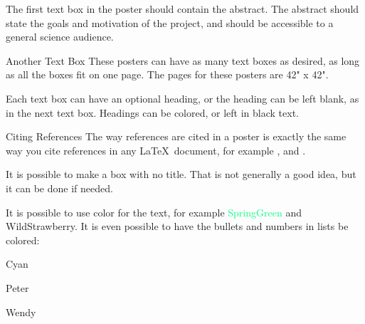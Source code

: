 \documentclass[12pt]{article}
\begin{document}
\begin{posterbard}



\begin{posterboxabstract} 
The first text box in the poster should contain the abstract. The abstract should state the goals and motivation of the project, and should be accessible to a general science audience.
\end{posterboxabstract}

\begin{posterboxtitle}{Another Text Box}
These posters can have as many text boxes as desired, as long as all the boxes fit on one page.  The pages for these posters are 42" x 42".

Each text box can have an optional heading, or the heading can be left blank, as in the next text box.  Headings can be colored, or left in black text.
\end{posterboxtitle}

\begin{posterboxtitle}{Citing References}
The way references are cited in a poster is exactly the same way you cite references in any \LaTeX\ document, for example \cite{CALCULUS}, \cite{PROJECT} and \cite{HOMOLOGY}.
\end{posterboxtitle}

\begin{posterboxnotitle}
It is possible to make a box with no title.  That is not generally a good idea, but it can be done if needed.
\end{posterboxnotitle}


\begin{posterboxnotitle}
It is possible to use color for the text, for example \textcolor{SpringGreen}{SpringGreen} and \textcolor{WildStrawberry}{WildStrawberry}.
It is even possible to have the bullets and numbers in lists be colored:

\begin{enumeratec}{Cyan}
\item Peter
\item Wendy
\end{enumeratec}


\end{posterboxnotitle}
\end{posterbard}
\end{document}
